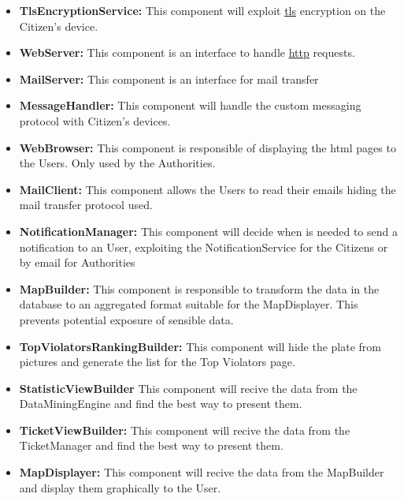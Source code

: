 \documentclass{article}
\newcommand{\link}[2]{{\color{blue}\underline{\href{#1}{#2}}}}
\begin{document}
\begin{itemize}
		 \item \label{component:TlsEncryptionService} \textbf{TlsEncryptionService:}
		 	This component will exploit \link{https://en.wikipedia.org/wiki/Transport_Layer_Security}{tls} encryption on the Citizen's device.
		 \item \label{component:WebServer} \textbf{WebServer:}
		 	This component is an interface to handle \link{https://en.wikipedia.org/wiki/Hypertext_Transfer_Protocol}{http} requests.
		 \item \label{component:MailServer} \textbf{MailServer:} 
		 	This component is an interface for mail transfer
		 \item \label{component:MessageHandler} \textbf{MessageHandler:} 
		 	This component will handle the custom messaging protocol with Citizen's devices.
		 \item \label{component:WebBrowser} \textbf{WebBrowser:}
		 	This component is responsible of displaying the html pages to the Users. Only used by the Authorities.
		 \item \label{component:MailClient} \textbf{MailClient:}
		 	This component allows the Users to read their emails hiding the mail transfer protocol used.
		 \item \label{component:NotificationManager} \textbf{NotificationManager:}
		 	This component will decide when is needed to send a notification to an User, exploiting the NotificationService for the Citizens
		 	or by email for Authorities
		 \item \label{component:MapBuilder} \textbf{MapBuilder:}
		 	This component is responsible to transform the data in the database to an aggregated format suitable for the MapDisplayer. 
		 	This prevents potential exposure of sensible data.
		 \item \label{component:TopViolatorsRankingBuilder} \textbf{TopViolatorsRankingBuilder:}
		 	This component will hide the plate from pictures and generate the list for the Top Violators page.
		 \item \label{component:StatisticViewBuilder} \textbf{StatisticViewBuilder}
		 	This component will recive the data from the DataMiningEngine and find the best way to present them.
		 \item \label{component:TicketViewBuilder} \textbf{TicketViewBuilder:}
		 	This component will recive the data from the TicketManager and find the best way to present them.
		 \item \label{component:MapDisplayer} \textbf{MapDisplayer:}
		 	This component will recive the data from the MapBuilder and display them graphically to the User.

\end{itemize}
\end{document}
